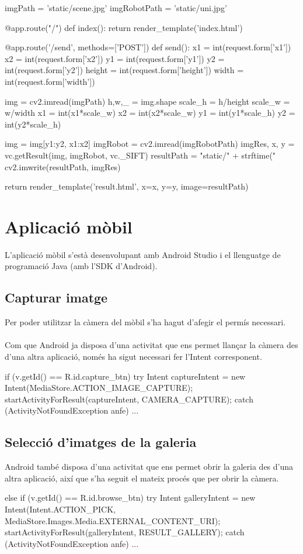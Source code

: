 		\begin{python}
imgPath = 'static/scene.jpg'
imgRobotPath = 'static/uni.jpg'

@app.route("/")
def index():
	return render_template('index.html')

@app.route('/send', methods=['POST'])
def send():
	x1 = int(request.form['x1'])
	x2 = int(request.form['x2'])
	y1 = int(request.form['y1'])
	y2 = int(request.form['y2'])
	height = int(request.form['height'])
	width = int(request.form['width'])

	img = cv2.imread(imgPath)
	h,w,_ = img.shape
	scale_h = h/height
	scale_w = w/width
	x1 = int(x1*scale_w)
	x2 = int(x2*scale_w)
	y1 = int(y1*scale_h)
	y2 = int(y2*scale_h)

	img = img[y1:y2, x1:x2]
	imgRobot = cv2.imread(imgRobotPath)
	imgRes, x, y = vc.getResult(img, imgRobot, vc._SIFT)
	resultPath = "static/" + strftime("%
	cv2.imwrite(resultPath, imgRes)

	return render_template('result.html', x=x, y=y, image=resultPath)
		\end{python}

\newpage
\section{Aplicació mòbil}
	L'aplicació mòbil s'està desenvolupant amb Android Studio i el llenguatge de programació Java (amb l'SDK d'Android).
	\subsection{Capturar imatge}
		Per poder utilitzar la càmera del mòbil s'ha hagut d'afegir el permís necessari.\\\\
		Com que Android ja disposa d'una activitat que ens permet llançar la càmera des d'una altra aplicació, només ha sigut necessari fer l'Intent corresponent.\\
		\begin{java}
if (v.getId() == R.id.capture_btn) try {
	Intent captureIntent = new Intent(MediaStore.ACTION_IMAGE_CAPTURE);
	startActivityForResult(captureIntent, CAMERA_CAPTURE);
} catch (ActivityNotFoundException anfe) {...}
		\end{java}
	\subsection{Selecció d'imatges de la galeria}
		Android també disposa d'una activitat que ens permet obrir la galeria des d'una altra aplicació, així que s'ha seguit el mateix procés que per obrir la càmera.\\
		\begin{java}
else if (v.getId() == R.id.browse_btn) try {
	Intent galleryIntent = new Intent(Intent.ACTION_PICK, MediaStore.Images.Media.EXTERNAL_CONTENT_URI);
	startActivityForResult(galleryIntent, RESULT_GALLERY);
} catch (ActivityNotFoundException anfe) {...}
		\end{java}
